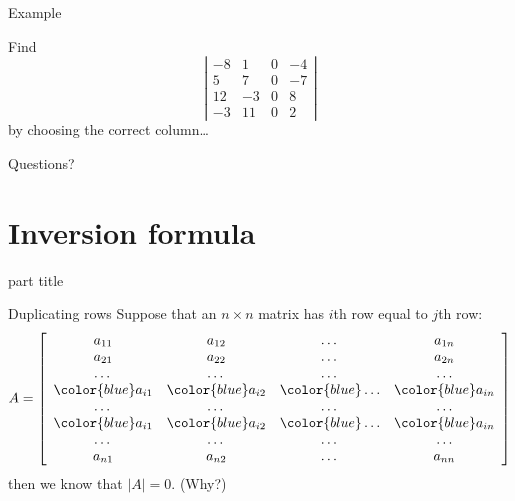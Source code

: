 \documentclass{beamer}
\begin{document}
\begin{frame}{Example}
  \begin{example}
    Find
    \begin{equation*}
      \left|
	\begin{array}{cccc}
          -8&1&0&-4\\
          5&7&0&-7\\
          12&-3&0&8\\
          -3&11&0&2
	\end{array}
      \right|
    \end{equation*}
    by choosing the correct column\dots
  \end{example}
\end{frame}

\begin{frame}
  Questions?
\end{frame}

\section{Inversion formula}

\begin{frame}
  \begin{beamercolorbox}[sep=12pt,center]{part title}
    \insertsection\par
  \end{beamercolorbox}
\end{frame}

\begin{frame}{Duplicating rows}
  Suppose that an $n\times n$ matrix has $i$th row equal to $j$th row:
  \begin{equation*}
    A = \left[
      \begin{array}{cccc}
        a_{11} & a_{12} & \dots & a_{1n}\\
        a_{21} & a_{22} & \dots & a_{2n}\\
        \dots & \dots & \dots & \dots\\
        {\color{blue}a_{i1}} & {\color{blue}a_{i2}} & {\color{blue}\dots} & {\color{blue}a_{in}}\\
        \dots & \dots & \dots & \dots\\
        {\color{blue}a_{i1}} & {\color{blue}a_{i2}} & {\color{blue}\dots}& {\color{blue}a_{in}}\\
        \dots & \dots & \dots & \dots\\
        a_{n1} & a_{n2} & \dots & a_{nn}\\
      \end{array}
    \right]
  \end{equation*}
  then we know that $\left|A\right| = 0$. (Why?)
\end{frame}
\end{document}
